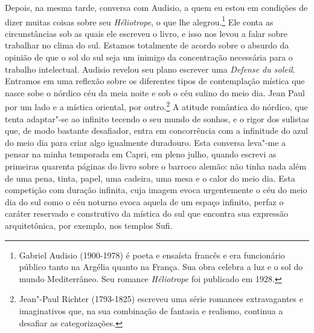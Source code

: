 Depois, na mesma tarde, conversa com Audisio, a quem eu estou em
condições de dizer muitas coisas sobre seu \emph{Héliotrope}, o que lhe
alegrou.\footnote{Gabriel Audisio (1900-1978) é poeta e ensaísta
  francês e era funcionário público tanto na Argélia quanto na França.
  Sua obra celebra a luz e o sol do mundo Mediterrâneo. Seu romance
  \emph{Héliotrope} foi publicado em 1928. \versal{[N. E.]}} Ele conta as circunstâncias
sob as quais ele escreveu o livro, e isso nos levou a falar sobre
trabalhar no clima do sul. Estamos totalmente de acordo sobre o absurdo
da opinião de que o sol do sul seja um inimigo da concentração
necessária para o trabalho intelectual. Audisio revelou seu plano
escrever uma \emph{Defense du soleil}. Entramos em uma reflexão sobre os
diferentes tipos de contemplação mística que nasce sobe o nórdico céu da
meia noite e sob o céu sulino do meio dia. Jean Paul por um lado e a
mística oriental, por outro.\footnote{Jean"-Paul Richter (1793-1825)
  escreveu uma série romances extravagantes e imaginativos que, na sua
  combinação de fantasia e realismo, continua a desafiar as
  categorizações. \versal{[N. E.]}} A atitude romântica do nórdico, que tenta adaptar"-se
ao infinito tecendo o seu mundo de sonhos, e o rigor dos sulistas que,
de modo bastante desafiador, entra em concorrência com a infinitude do
azul do meio dia para criar algo igualmente duradouro. Esta conversa
leva"-me a pensar na minha temporada em Capri, em pleno julho, quando
escrevi as primeiras quarenta páginas do livro sobre o barroco alemão:
não tinha nada além de uma pena, tinta, papel, uma cadeira, uma mesa e o
calor do meio dia. Esta competição com duração infinita, cuja imagem
evoca urgentemente o céu do meio dia do sul como o céu noturno evoca
aquela de um espaço infinito, perfaz o caráter reservado e construtivo
da mística do sul que encontra sua expressão arquitetônica, por exemplo,
nos templos Sufi.

